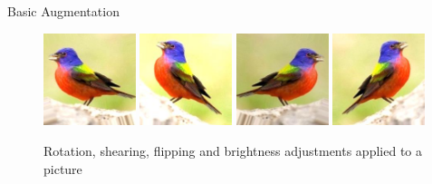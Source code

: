 \documentclass[a4paper,10pt]{beamer}
\begin{document}
\begin{frame}{Basic Augmentation}

\begin{figure}[h]
	\includegraphics[width=0.24\textwidth]{aug1.jpeg}
\includegraphics[width=0.24\textwidth]{aug2.jpeg}
\includegraphics[width=0.24\textwidth]{aug3.jpeg}
\includegraphics[width=0.24\textwidth]{aug4.jpeg}
	\caption{Rotation, shearing, flipping and brightness adjustments applied to a picture}
\end{figure}

\end{frame}
\end{document}
